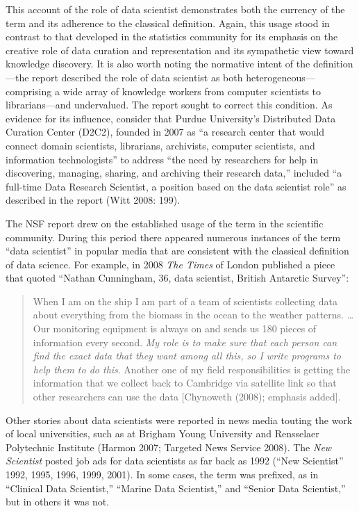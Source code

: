 \documentclass[
  letterpaper,
]{report}
\begin{document}
This account of the role of data scientist demonstrates both the
currency of the term and its adherence to the classical definition.
Again, this usage stood in contrast to that developed in the statistics
community for its emphasis on the creative role of data curation and
representation and its sympathetic view toward knowledge discovery. It
is also worth noting the normative intent of the definition---the report
described the role of data scientist as both heterogeneous---comprising
a wide array of knowledge workers from computer scientists to
librarians---and undervalued. The report sought to correct this
condition. As evidence for its influence, consider that Purdue
University's Distributed Data Curation Center (D2C2), founded in 2007 as
``a research center that would connect domain scientists, librarians,
archivists, computer scientists, and information technologists'' to
address ``the need by researchers for help in discovering, managing,
sharing, and archiving their research data,'' included ``a full-time
Data Research Scientist, a position based on the data scientist role''
as described in the report (Witt 2008: 199).

The NSF report drew on the established usage of the term in the
scientific community. During this period there appeared numerous
instances of the term ``data scientist'' in popular media that are
consistent with the classical definition of data science. For example,
in 2008 \emph{The Times} of London published a piece that quoted
``Nathan Cunningham, 36, data scientist, British Antarctic Survey'':

\begin{quote}
When I am on the ship I am part of a team of scientists collecting data
about everything from the biomass in the ocean to the weather patterns.
\ldots{} Our monitoring equipment is always on and sends us 180 pieces
of information every second. \emph{My role is to make sure that each
person can find the exact data that they want among all this, so I write
programs to help them to do this}. Another one of my field
responsibilities is getting the information that we collect back to
Cambridge via satellite link so that other researchers can use the data
{[}Chynoweth (2008); emphasis added{]}.
\end{quote}

Other stories about data scientists were reported in news media touting
the work of local universities, such as at Brigham Young University and
Rensselaer Polytechnic Institute (Harmon 2007; Targeted News Service
2008). The \emph{New Scientist} posted job ads for data scientists as
far back as 1992 ({``New Scientist''} 1992, 1995, 1996, 1999, 2001). In
some cases, the term was prefixed, as in ``Clinical Data Scientist,''
``Marine Data Scientist,'' and ``Senior Data Scientist,'' but in others
it was not.
\end{document}

